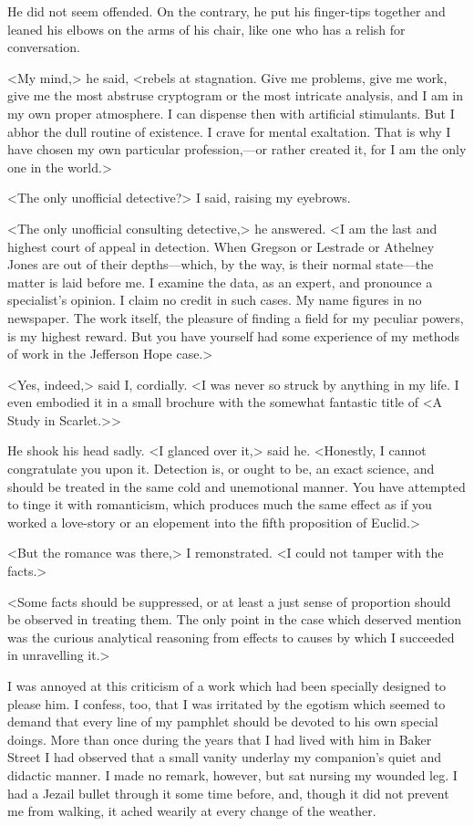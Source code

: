 He did not seem offended. On the contrary, he put his finger-tips together and leaned his elbows on the arms of his chair, like one who has a relish for conversation.

<My mind,> he said, <rebels at stagnation. Give me problems, give me work, give me the most abstruse cryptogram or the most intricate analysis, and I am in my own proper atmosphere. I can dispense then with artificial stimulants. But I abhor the dull routine of existence. I crave for mental exaltation. That is why I have chosen my own particular profession,—or rather created it, for I am the only one in the world.>

<The only unofficial detective?> I said, raising my eyebrows.

<The only unofficial consulting detective,> he answered. <I am the last and highest court of appeal in detection. When Gregson or Lestrade or Athelney Jones are out of their depths—which, by the way, is their normal state—the matter is laid before me. I examine the data, as an expert, and pronounce a specialist's opinion. I claim no credit in such cases. My name figures in no newspaper. The work itself, the pleasure of finding a field for my peculiar powers, is my highest reward. But you have yourself had some experience of my methods of work in the Jefferson Hope case.>

<Yes, indeed,> said I, cordially. <I was never so struck by anything in my life. I even embodied it in a small brochure with the somewhat fantastic title of <A Study in Scarlet.>>

He shook his head sadly. <I glanced over it,> said he. <Honestly, I cannot congratulate you upon it. Detection is, or ought to be, an exact science, and should be treated in the same cold and unemotional manner. You have attempted to tinge it with romanticism, which produces much the same effect as if you worked a love-story or an elopement into the fifth proposition of Euclid.>

<But the romance was there,> I remonstrated. <I could not tamper with the facts.>

<Some facts should be suppressed, or at least a just sense of proportion should be observed in treating them. The only point in the case which deserved mention was the curious analytical reasoning from effects to causes by which I succeeded in unravelling it.>

I was annoyed at this criticism of a work which had been specially designed to please him. I confess, too, that I was irritated by the egotism which seemed to demand that every line of my pamphlet should be devoted to his own special doings. More than once during the years that I had lived with him in Baker Street I had observed that a small vanity underlay my companion's quiet and didactic manner. I made no remark, however, but sat nursing my wounded leg. I had a Jezail bullet through it some time before, and, though it did not prevent me from walking, it ached wearily at every change of the weather.

